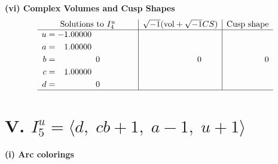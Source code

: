 \documentclass[1p]{elsarticle_modified}
\theoremstyle{definition}
\newcommand{\I}{\sqrt{-1}}
\begin{document}
\newpage\flushleft \textbf{(vi) Complex Volumes and Cusp Shapes}
$$\begin{array}{c|c|c}  
\text{Solutions to }I^u_{4}& \I (\text{vol} + \sqrt{-1}CS) & \text{Cusp shape}\\
 \hline 
\begin{aligned}
u &= -1.00000\phantom{ +0.000000I} \\
a &= \phantom{-}1.00000\phantom{ +0.000000I} \\
b &= \phantom{-0.000000 } 0 \\
c &= \phantom{-}1.00000\phantom{ +0.000000I} \\
d &= \phantom{-0.000000 } 0\end{aligned}
 & \phantom{-0.000000 } 0 & \phantom{-0.000000 } 0\\
 \hline 
 \end{array}$$\newpage\newpage\renewcommand{\arraystretch}{1}
\centering \section*{V. $I^u_{5}= \langle d,\;c b+1,\;a-1,\;u+1 \rangle$}
\flushleft \textbf{(i) Arc colorings}\\
\end{document}
